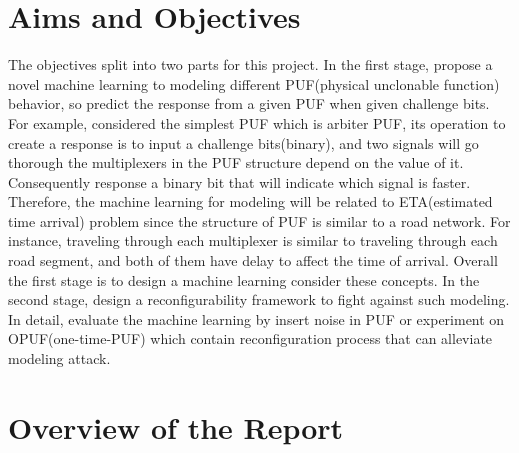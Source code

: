 \section{Aims and Objectives}
The objectives split into two parts for this project. In the first stage, propose a novel machine learning to modeling different PUF(physical unclonable function)
behavior, so predict the response from a given PUF when given challenge bits. For example, considered the simplest PUF which is arbiter PUF, its operation to create a response is to
input a challenge bits(binary), and two signals will go thorough the multiplexers in the PUF structure depend on the value of it. Consequently response a binary bit
that will indicate which signal is faster. Therefore, the machine learning for modeling will be related to ETA(estimated time arrival) problem since the structure of PUF is similar to a road network. 
For instance, traveling through each multiplexer is similar to traveling through each road segment, and both of them have delay to affect the time of arrival. Overall the first stage is to design a machine learning
consider these concepts. In the second stage, design a reconfigurability framework to fight against such modeling. In detail, evaluate the machine learning by insert noise in PUF or experiment on OPUF(one-time-PUF) which
contain reconfiguration process that can alleviate modeling attack.

\section{Overview of the Report}

